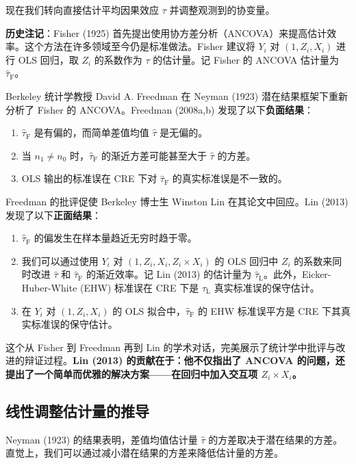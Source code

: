现在我们转向直接估计平均因果效应 $\tau$ 并调整观测到的协变量。

\textbf{历史注记}：Fisher (1925) 首先提出使用协方差分析（ANCOVA）来提高估计效率。这个方法在许多领域至今仍是标准做法。Fisher 建议将 $Y_i$ 对 $(1, Z_i, X_i)$ 进行 OLS 回归，取 $Z_i$ 的系数作为 $\tau$ 的估计量。记 Fisher 的 ANCOVA 估计量为 $\hat{\tau}_{\mathrm{F}}$。

Berkeley 统计学教授 David A. Freedman 在 Neyman (1923) 潜在结果框架下重新分析了 Fisher 的 ANCOVA。Freedman (2008a,b) 发现了以下\textbf{负面结果}：

\begin{enumerate}
  \item $\hat{\tau}_{\mathrm{F}}$ 是有偏的，而简单差值均值 $\hat{\tau}$ 是无偏的。
  \item 当 $n_1 \neq n_0$ 时，$\hat{\tau}_{\mathrm{F}}$ 的渐近方差可能甚至大于 $\hat{\tau}$ 的方差。
  \item OLS 输出的标准误在 CRE 下对 $\hat{\tau}_{\mathrm{F}}$ 的真实标准误是不一致的。
\end{enumerate}

Freedman 的批评促使 Berkeley 博士生 Winston Lin 在其论文中回应。Lin (2013) 发现了以下\textbf{正面结果}：

\begin{enumerate}
  \item $\hat{\tau}_{\mathrm{F}}$ 的偏发生在样本量趋近无穷时趋于零。
  \item 我们可以通过使用 $Y_i$ 对 $(1, Z_i, X_i, Z_i \times X_i)$ 的 OLS 回归中 $Z_i$ 的系数来同时改进 $\hat{\tau}$ 和 $\hat{\tau}_{\mathrm{F}}$ 的渐近效率。记 Lin (2013) 的估计量为 $\hat{\tau}_{\mathrm{L}}$。此外，Eicker-Huber-White (EHW) 标准误在 CRE 下是 $\hat{\tau}_{\mathrm{L}}$ 真实标准误的保守估计。
  \item 在 $Y_i$ 对 $(1, Z_i, X_i)$ 的 OLS 拟合中，$\hat{\tau}_{\mathrm{F}}$ 的 EHW 标准误平方是 CRE 下其真实标准误的保守估计。
\end{enumerate}

这个从 Fisher 到 Freedman 再到 Lin 的学术对话，完美展示了统计学中批评与改进的辩证过程。\textbf{Lin (2013) 的贡献在于：他不仅指出了 ANCOVA 的问题，还提出了一个简单而优雅的解决方案——在回归中加入交互项 $Z_i \times X_i$。}

\subsection{线性调整估计量的推导}\label{sec:6-linear-adj-estimator}

Neyman (1923) 的结果表明，差值均值估计量 $\hat{\tau}$ 的方差取决于潜在结果的方差。直觉上，我们可以通过减小潜在结果的方差来降低估计量的方差。

